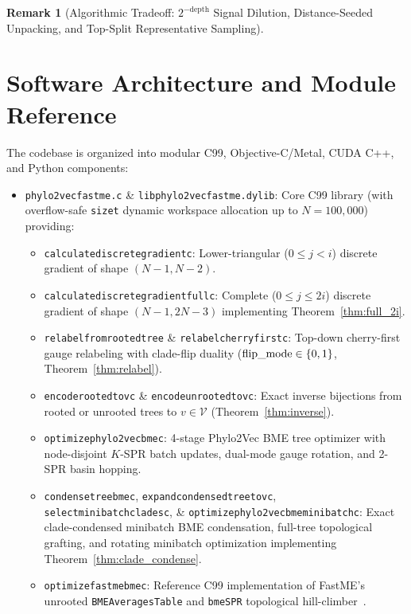 \documentclass[11pt,a4paper]{article}
\makeatletter
\DeclareRobustCommand{\_}{\ifmmode\nfss@text{\textunderscore}\else\textunderscore\allowbreak\fi}
\theoremstyle{definition}
\newtheorem{remark}[theorem]{Remark}
\makeatother
\begin{document}
\begin{remark}[Algorithmic Tradeoff: $2^{-\text{depth}}$ Signal Dilution, Distance-Seeded Unpacking, and Top-Split Representative Sampling]
\begin{enumerate}
\end{enumerate}
\end{remark}

\section{Software Architecture and Module Reference}
\label{sec:software}

The codebase is organized into modular C99, Objective-C/Metal, CUDA C++, and Python components:
\begin{itemize}
    \item \texttt{phylo2vec\_fastme.c} \& \texttt{libphylo2vec\_fastme.dylib}: Core C99 library (with overflow-safe \texttt{size\_t} dynamic workspace allocation up to $N = 100{,}000$) providing:
    \begin{itemize}
        \item \texttt{calculate\_discrete\_gradient\_c}: Lower-triangular ($0 \le j < i$) discrete gradient of shape $(N-1, N-2)$.
        \item \texttt{calculate\_discrete\_gradient\_full\_c}: Complete ($0 \le j \le 2i$) discrete gradient of shape $(N-1, 2N-3)$ implementing Theorem~\ref{thm:full_2i}.
        \item \texttt{relabel\_from\_rooted\_tree} \& \texttt{relabel\_cherry\_first\_c}: Top-down cherry-first gauge relabeling with clade-flip duality ($\text{flip\_mode} \in \{0, 1\}$, Theorem~\ref{thm:relabel}).
        \item \texttt{encode\_rooted\_to\_v\_c} \& \texttt{encode\_unrooted\_to\_v\_c}: Exact inverse bijections from rooted or unrooted trees to $v \in \mathcal{V}$ (Theorem~\ref{thm:inverse}).
        \item \texttt{optimize\_phylo2vec\_bme\_c}: 4-stage Phylo2Vec BME tree optimizer with node-disjoint $K$-SPR batch updates, dual-mode gauge rotation, and 2-SPR basin hopping.
        \item \texttt{condense\_tree\_bme\_c}, \texttt{expand\_condensed\_tree\_to\_v\_c}, \texttt{select\_minibatch\_clades\_c}, \& \texttt{optimize\_phylo2vec\_bme\_minibatch\_c}: Exact clade-condensed minibatch BME condensation, full-tree topological grafting, and rotating minibatch optimization implementing Theorem~\ref{thm:clade_condense}.
        \item \texttt{optimize\_fastme\_bme\_c}: Reference C99 implementation of FastME's unrooted \texttt{BMEAveragesTable} and \texttt{bmeSPR} topological hill-climber~\cite{desper2002fast,lefort2015fastme}.

\end{itemize}
\end{itemize}
\end{document}
